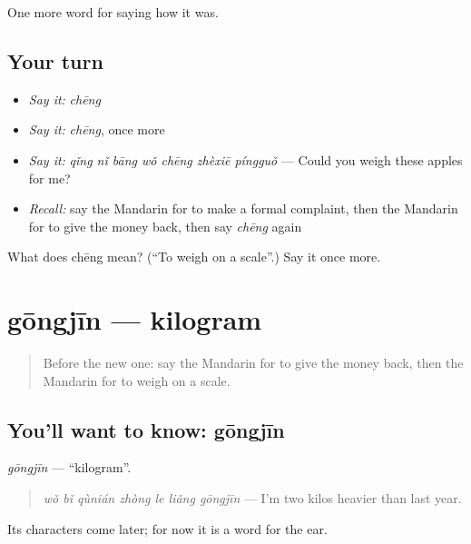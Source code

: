 \begin{grammarlens}[title={What you've built}]
One more word for saying how it was.
\end{grammarlens}

\subsection*{Your turn}
\begin{itemize}
\raggedright
  \item \emph{Say it:} \emph{chēng}
  \item \emph{Say it:} \emph{chēng}, once more
  \item \emph{Say it:} \emph{qǐng nǐ bāng wǒ chēng zhèxiē píngguǒ} — Could you weigh these apples for me?
  \item \emph{Recall:} say the Mandarin for to make a formal complaint, then the Mandarin for to give the money back, then say \emph{chēng} again
\end{itemize}

\begin{tcolorbox}[breakable,colback=teal!4,colframe=teal!35!black,title={Before you move on}]
What does chēng mean? (\textquotedblleft{}To weigh on a scale\textquotedblright{}.) Say it once more.
\end{tcolorbox}
\section[gōngjīn]{gōngjīn — kilogram}

\label{lesson:ZH-C526-gongjin}



\begin{quote}
Before the new one: say the Mandarin for to give the money back, then the Mandarin for to weigh on a scale.
\end{quote}

\subsection*{You'll want to know: gōngjīn}
\emph{gōngjīn} — \textquotedblleft{}kilogram\textquotedblright{}.

\begin{quote}
\emph{wǒ bǐ qùnián zhòng le liǎng gōngjīn} — I'm two kilos heavier than last year.
\end{quote}

Its characters come later; for now it is a word for the ear.

